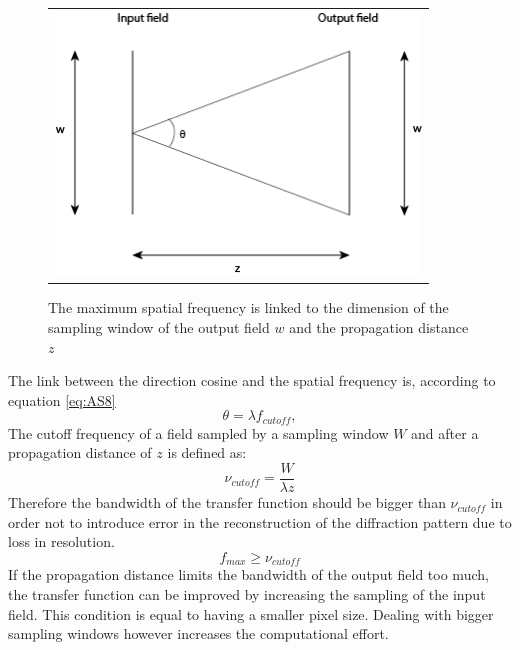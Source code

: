  \begin{figure}[h]
 	\begin{center}
 		\begin{tabular}{c}
 				\includegraphics[height=7cm]{cutofffrequency.png}
 		\end{tabular}
 	\end{center}
 	\caption	{ \label{fig:maxfrequency} 
 		The maximum spatial frequency is linked to the dimension of the sampling window of the output field $w$ and the propagation distance $z$ }
 \end{figure} 
 The link between the direction cosine and the spatial frequency is, according to equation \ref{eq:AS8}
 \begin{equation}
 \label{eq:BL13}
 \theta=\lambda f_{cutoff},
 \end{equation}
 The cutoff frequency of a field sampled by a sampling window $W$ and after a propagation distance of $z$ is defined as:
 \begin{equation}
 	\label{eq:BL14}
 	\nu_{cutoff}=\dfrac{W}{\lambda z}
 \end{equation}
 Therefore the bandwidth of the transfer function should be bigger than $\nu_{cutoff}$ in order not to introduce error in the reconstruction of the diffraction pattern due to loss in resolution.
 \begin{equation}
 \label{eq:BL15}
 f_{max}\geq\nu_{cutoff}
 \end{equation}
 If the propagation distance limits the bandwidth of the output field too much, the transfer function can be improved by increasing the sampling of the input field. This condition is equal to having a smaller pixel size. Dealing with bigger sampling windows however increases the computational effort. 
